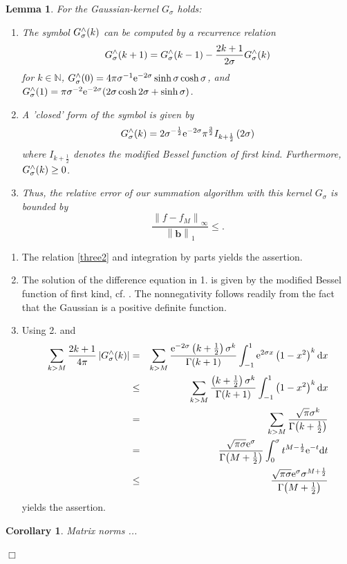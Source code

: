 \documentclass[11pt,a4paper,twoside,bibtotoc]{scrartcl}
\theoremstyle{plain}
\newtheorem{corollary}[theorem]{Corollary}
\newtheorem{lemma}[theorem]{Lemma}
\theoremstyle{definition}
\theoremstyle{remark}
\newenvironment{proof}{{\bf Proof.}}{$\Box$}
\newcommand{\N}{\ensuremath{\mathbb{N}}}
\newcommand{\abs}[1]{\ensuremath{\left\vert#1\right\vert}}
\newcommand{\fun}[2]{\ensuremath{#1{\hspace{-0.4ex}}\left(#2\right)}}
\newcommand{\mb}[1]{\mathbf{#1}}
\newcommand{\V}[1]{\mb{#1}}
\newcommand{\dx}{\text{\rm{d}}}
\newcommand{\e}{\mbox{\rm{e}}}
\numberwithin{equation}{section}
\numberwithin{table}{section}
\numberwithin{figure}{section}
\begin{document}
\begin{lemma}
For the Gaussian-kernel $G_{\sigma}$ holds:
  \begin{enumerate}
  \item The symbol $\fun{G_{\sigma}^{\wedge}}{k}$ can be computed by a
    recurrence relation
    \[
    \fun{G_{\sigma}^{\wedge}}{k+1} = 
    \fun{G_{\sigma}^{\wedge}}{k-1}   - \frac{2k+1}{2\sigma}
    \fun{G_{\sigma}^{\wedge}}{k}
    \]
    for $k\in \N$, $\fun{G_{\sigma}^{\wedge}}{0} = 4 \pi \sigma^{-1}
    \e^{-2\sigma} \sinh \sigma \cosh \sigma$, and
    $\fun{G_{\sigma}^{\wedge}}{1} = \pi \sigma^{-2} \e^{-2\sigma} (2 \sigma
    \cosh 2 \sigma + \sinh \sigma )$.
  \item A 'closed' form of the symbol is given by
    \[
    \fun{G_{\sigma}^{\wedge}}{k} = 2 \sigma^{-\frac{1}{2}} \e^{-2\sigma}
    \pi^{\frac{3}{2}} I_{k+\frac{1}{2}}\left(2\sigma\right)
    \]
    where $I_{k+\frac{1}{2}}$ denotes the modified Bessel function of first kind.
    Furthermore, $\fun{G_{\sigma}^{\wedge}}{k} \ge 0$.
  \item Thus, the relative error of our summation algorithm with this
  kernel $G_{\sigma}$ is bounded by
  \begin{equation}
    \label{error:G}
    \frac{\left\|f - f_{M}\right\|_{\infty}}{\left\|\V{b}\right\|_1} \le
    .
  \end{equation} 
\end{enumerate}
\end{lemma}
\begin{proof}
  \begin{enumerate}
  \item The relation \eqref{three2} and integration by parts yields the
  assertion.
  \item The solution of the difference equation in 1. is given by the modified
  Bessel function of first kind, cf. \cite{bahu01}.
  The nonnegativity follows readily from the fact that the Gaussian is a
  positive definite function.
  \item Using 2. and
  \begin{eqnarray*}
    \sum_{k>M} \frac{2k+1}{4\pi} \abs{\fun{G_{\sigma}^{\wedge}}{k}}
    &=&
    \sum_{k>M} \frac{\e^{-2\sigma}
    \left(k+\frac{1}{2}\right)\sigma^k}{\fun{\Gamma}{k+1}} \int_{-1}^{1}
    \e^{2\sigma x} \left(1-x^2\right)^k \dx x\\
    &\le&
    \sum_{k>M} \frac{\left(k+\frac{1}{2}\right)\sigma^k}{\fun{\Gamma}{k+1}}
    \int_{-1}^{1} \left(1-x^2\right)^k \dx x\\
    &=&
    \sum_{k>M} \frac{\sqrt{\pi}\sigma^k}{\fun{\Gamma}{k+\frac{1}{2}}}\\
    &=&
    \frac{\sqrt{\pi\sigma}\e^{\sigma}}{\fun{\Gamma}{M+\frac{1}{2}}} 
    \int_{0}^{\sigma} t^{M-\frac{1}{2}} \e^{-t} \dx t\\
    &\le&
    \frac{\sqrt{\pi\sigma}\e^{\sigma} \sigma^{M+\frac{1}{2}}}{\fun{\Gamma}{M
    +\frac{1}{2}}}
  \end{eqnarray*}
  yields the assertion.
\end{enumerate}

\begin{corollary}
 Matrix norms ...
\end{corollary}
\end{proof}
\end{document}
